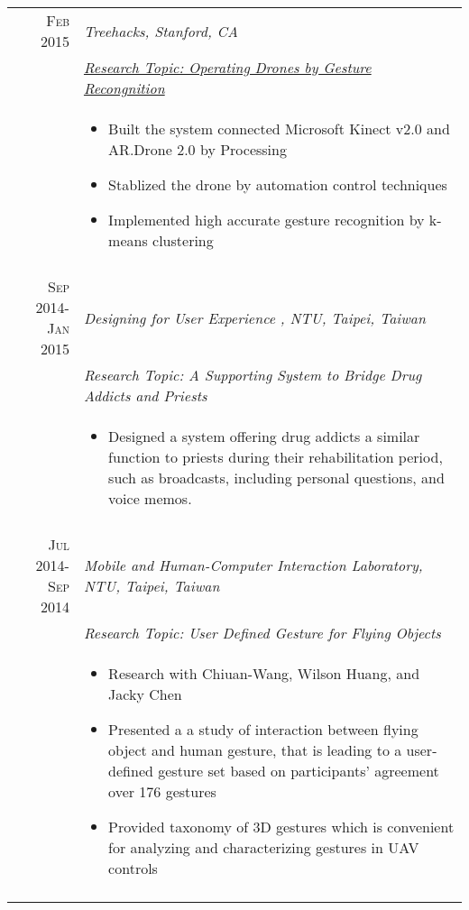 \documentclass[a4paper,11pt]{article} %
\begin{document}
\begin{tabular}{r|p{11cm}}

\textsc{Feb 2015} & \emph{Treehacks, Stanford, CA}\\ 
& \href{https://www.youtube.com/watch?v=jxsZaQ6PcXU}{\emph{Research Topic: Operating Drones by Gesture Recongnition}}\\
& \footnotesize{
\begin{itemize}
\item Built the system connected Microsoft Kinect v2.0 and AR.Drone 2.0 by Processing 
\item Stablized the drone by automation control techniques
\item Implemented high accurate gesture recognition by k-means clustering
\end{itemize}} \\
\multicolumn{2}{c}{} \\

\textsc{Sep 2014-Jan 2015} & \emph{Designing for User Experience , NTU, Taipei, Taiwan}\\ 
& \emph{Research Topic: A Supporting System to Bridge Drug Addicts and Priests}\\
& \footnotesize{
\begin{itemize}
\item Designed a system offering drug addicts a similar function to priests during their rehabilitation period, such as broadcasts, including personal questions, and voice memos.
\end{itemize}} \\
\multicolumn{2}{c}{} \\

\textsc{Jul 2014-Sep 2014} & \emph{Mobile and Human-Computer Interaction Laboratory, NTU, Taipei, Taiwan}\\ 
& \emph{Research Topic: User Defined Gesture for Flying Objects}\\
& \footnotesize{
\begin{itemize}
\item Research with Chiuan-Wang, Wilson Huang, and Jacky Chen
\item Presented a a study of interaction between flying object and human gesture, that is leading to a user-defined gesture set based on participants’ agreement over 176 gestures
\item Provided taxonomy of 3D gestures which is convenient for analyzing and characterizing gestures in UAV controls
\end{itemize}} \\
\multicolumn{2}{c}{} \\

\end{tabular}
\end{document}
